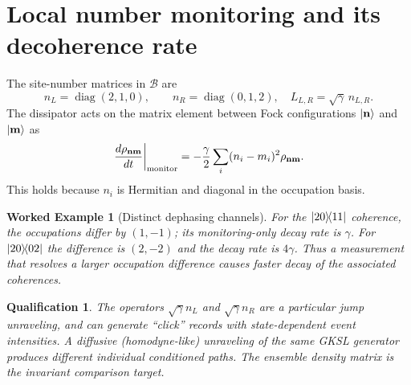 \documentclass[11pt,a4paper]{article}
\newtheorem{example}{Worked Example}\newtheorem{remark}{Qualification}\newtheorem{proposition}{Proposition}
\begin{document}
\section{Local number monitoring and its decoherence rate}
The site-number matrices in $\mathcal B$ are
\begin{equation}
n_L=\operatorname{diag}(2,1,0),\qquad n_R=\operatorname{diag}(0,1,2),\quad L_{L,R}=\sqrt\gamma\,n_{L,R}.
\end{equation}
The dissipator acts on the matrix element between Fock configurations $|\mathbf n\rangle$ and $|\mathbf m\rangle$ as
\begin{equation}\label{eq:dephase}
\left.\frac{d\rho_{\mathbf n\mathbf m}}{dt}\right|_{\rm monitor}=-\frac\gamma2\sum_i(n_i-m_i)^2\rho_{\mathbf n\mathbf m}.
\end{equation}
This holds because $n_i$ is Hermitian and diagonal in the occupation basis.
\begin{example}[Distinct dephasing channels]
For the $|20\rangle\!\langle11|$ coherence, the occupations differ by $(1,-1)$; its monitoring-only decay rate is $\gamma$. For $|20\rangle\!\langle02|$ the difference is $(2,-2)$ and the decay rate is $4\gamma$. Thus a measurement that resolves a larger occupation difference causes faster decay of the associated coherences.
\end{example}
\begin{remark}
The operators $\sqrt\gamma n_L$ and $\sqrt\gamma n_R$ are a particular jump unraveling, and can generate ``click'' records with state-dependent event intensities. A diffusive (homodyne-like) unraveling of the same GKSL generator produces different individual conditioned paths. The ensemble density matrix is the invariant comparison target.
\end{remark}
\end{document}
